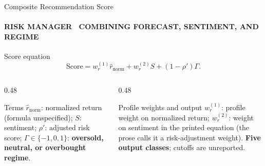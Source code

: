 \documentclass[aspectratio=169,11pt]{beamer}
\newcommand{\keyphrase}[1]{\textbf{\color{DELCONred}#1}}
\begin{document}
\begin{frame}{Composite Recommendation Score}
  \framesubtitle{RISK MANAGER \textbullet\ COMBINING FORECAST, SENTIMENT, AND REGIME}
  \begin{alertblock}{Score equation}
    \centering\Large
    \begin{equation*}
      \mathrm{Score}=w_r^{(1)}\hat r_{\mathrm{norm}}+w_r^{(2)}S+(1-\rho')\Gamma.
    \end{equation*}
  \end{alertblock}
  \vspace{0.10cm}
  \begin{columns}[T,onlytextwidth]
    \begin{column}{0.48\textwidth}
      \begin{block}{Terms}
        \scriptsize $\hat r_{\mathrm{norm}}$: normalized return (formula unspecified); $S$: sentiment; $\rho'$: adjusted risk score; $\Gamma\in\{-1,0,1\}$: \keyphrase{oversold, neutral, or overbought regime}.
      \end{block}
    \end{column}
    \begin{column}{0.48\textwidth}
      \begin{block}{Profile weights and output}
        \scriptsize $w_r^{(1)}$: profile weight on normalized return; $w_r^{(2)}$: weight on sentiment in the printed equation (the prose calls it a risk-adjustment weight). \keyphrase{Five output classes}; cutoffs are unreported.
      \end{block}
    \end{column}
  \end{columns}
\end{frame}
\end{document}

